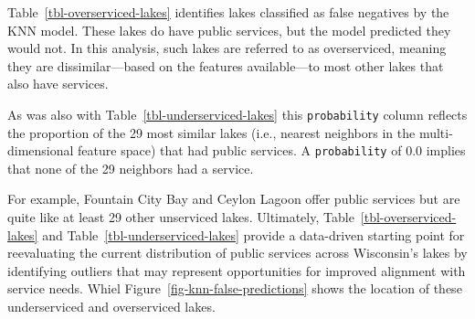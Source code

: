 \documentclass[
]{article}
\begin{document}
Table~\ref{tbl-overserviced-lakes} identifies lakes classified as false
negatives by the KNN model. These lakes do have public services, but the
model predicted they would not. In this analysis, such lakes are
referred to as overserviced, meaning they are dissimilar---based on the
features available---to most other lakes that also have services.

As was also with Table~\ref{tbl-underserviced-lakes} this
\texttt{probability} column reflects the proportion of the 29 most
similar lakes (i.e., nearest neighbors in the multi-dimensional feature
space) that had public services. A \texttt{probability} of 0.0 implies
that none of the 29 neighbors had a service.

For example, Fountain City Bay and Ceylon Lagoon offer public services
but are quite like at least 29 other unserviced lakes. Ultimately,
Table~\ref{tbl-overserviced-lakes} and
Table~\ref{tbl-underserviced-lakes} provide a data-driven starting point
for reevaluating the current distribution of public services across
Wisconsin's lakes by identifying outliers that may represent
opportunities for improved alignment with service needs. Whiel
Figure~\ref{fig-knn-false-predictions} shows the location of these
underserviced and overserviced lakes.
\end{document}
